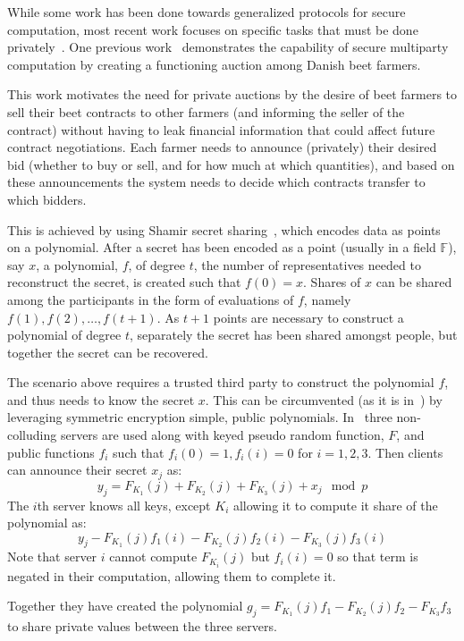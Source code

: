 While some work has been done towards generalized protocols for secure
computation, most recent work focuses on specific tasks that must be done
privately~\cite{bogetoft2009secure,miers2013zerocoin,parno2013pinocchio}. One
previous work~\cite{bogetoft2009secure} demonstrates the capability of secure
multiparty computation by creating a functioning auction among Danish beet
farmers. 

This work motivates the need for private auctions by the desire of beet farmers
to sell their beet contracts to other farmers (and informing the seller of the
contract) without having to leak financial information that could affect future
contract negotiations. Each farmer needs to announce (privately) their desired
bid (whether to buy or sell, and for how much at which quantities), and based on
these announcements the system needs to decide which contracts transfer to which
bidders.

This is achieved by using Shamir secret sharing~\cite{shamir1979share}, which
encodes data as points on a polynomial. After a secret has been encoded as a
point (usually in a field $\mathbb{F}$), say $x$, a polynomial, $f$, of degree
$t$, the number of representatives needed to reconstruct the secret, is created
such that $f(0)= x$. Shares of $x$ can be shared among the participants in the
form of evaluations of $f$, namely $f(1), f(2),\ldots, f(t+1)$. As $t+1$ points
are necessary to construct a polynomial of degree $t$, separately the secret has
been shared amongst people, but together the secret can be recovered.

The scenario above requires a trusted third party to construct the polynomial
$f$, and thus needs to know the secret $x$. This can be circumvented (as it is
in~\cite{bogetoft2009secure}) by leveraging symmetric encryption simple, public
polynomials. In~\cite{bogetoft2009secure} three non-colluding servers are used
along with keyed pseudo random function, $F$, and public functions $f_i$ such
that $f_i(0) = 1, f_i(i) = 0$ for $i=1,2,3$. Then clients can announce their
secret $x_j$ as:
\[
    y_j = F_{K_1}(j) + F_{K_2}(j) + F_{K_3}(j) + x_j \mod p
\]
The $i$th server knows all keys, except $K_i$ allowing it to compute it share of
the polynomial as:
\[
    y_j - F_{K_1}(j)f_1(i) - F_{K_2}(j)f_2(i) - F_{K_3}(j)f_3(i)
\]
Note that server $i$ cannot compute $F_{K_i}(j)$ but $f_i(i) = 0$ so that term
is negated in their computation, allowing them to complete it.

Together they have created the polynomial $g_j = F_{K_1}(j)f_1 - F_{K_2}(j)f_2
- F_{K_3}f_3$ to share private values between the three servers.


